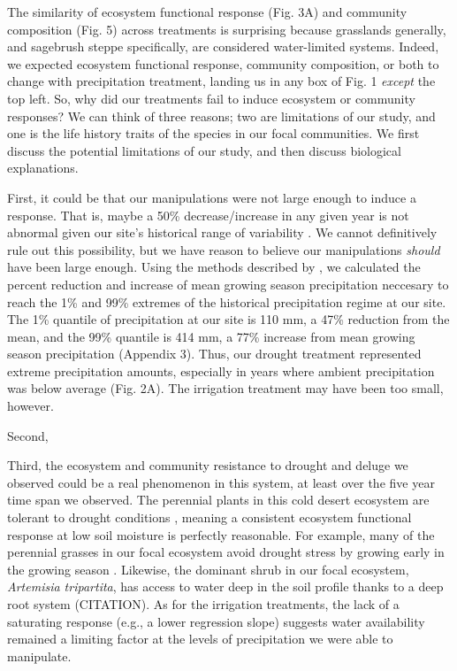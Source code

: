 \documentclass[fleqn,10pt,lineno]{wlpeerj} %
\begin{document}
The similarity of ecosystem functional response (Fig. 3A) and community
composition (Fig. 5) across treatments is surprising because grasslands
generally, and sagebrush steppe specifically, are considered
water-limited systems. Indeed, we expected ecosystem functional
response, community composition, or both to change with precipitation
treatment, landing us in any box of Fig. 1 \emph{except} the top left.
So, why did our treatments fail to induce ecosystem or community
responses? We can think of three reasons; two are limitations of our
study, and one is the life history traits of the species in our focal
communities. We first discuss the potential limitations of our study,
and then discuss biological explanations.

First, it could be that our manipulations were not large enough to
induce a response. That is, maybe a 50\% decrease/increase in any given
year is not abnormal given our site's historical range of variability
\citep{Knapp2017}. We cannot definitively rule out this possibility, but
we have reason to believe our manipulations \emph{should} have been
large enough. Using the methods described by \citet{Lemoine2016}, we
calculated the percent reduction and increase of mean growing season
precipitation neccesary to reach the 1\% and 99\% extremes of the
historical precipitation regime at our site. The 1\% quantile of
precipitation at our site is 110 mm, a 47\% reduction from the mean, and
the 99\% quantile is 414 mm, a 77\% increase from mean growing season
precipitation (Appendix 3). Thus, our drought treatment represented
extreme precipitation amounts, especially in years where ambient
precipitation was below average (Fig. 2A). The irrigation treatment may
have been too small, however.

Second,

Third, the ecosystem and community resistance to drought and deluge we
observed could be a real phenomenon in this system, at least over the
five year time span we observed. The perennial plants in this cold
desert ecosystem are tolerant to drought conditions \citep[A.R.
Kleinhesselink, unpublished data]{Bazzaz1979, Franks2011}, meaning a
consistent ecosystem functional response at low soil moisture is
perfectly reasonable. For example, many of the perennial grasses in our
focal ecosystem avoid drought stress by growing early in the growing
season \citep[A.R. Kleinhesselink, personal observation]{Blaisdell1958}.
Likewise, the dominant shrub in our focal ecosystem, \emph{Artemisia
tripartita}, has access to water deep in the soil profile thanks to a
deep root system (CITATION). As for the irrigation treatments, the lack
of a saturating response (e.g., a lower regression slope) suggests water
availability remained a limiting factor at the levels of precipitation
we were able to manipulate.
\end{document}
